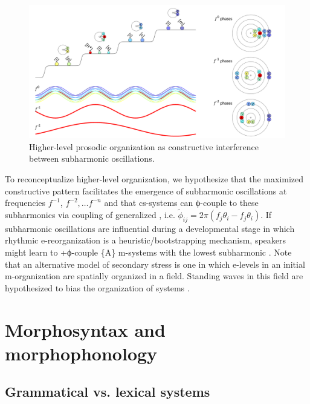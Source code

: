   
\begin{figure}
\includegraphics[width=\textwidth]{figures/Tilsen-img64.png}
\caption{Higher-level prosodic organization as constructive interference between subharmonic oscillations.}
\label{fig:4:14}
\end{figure}
 

  To reconceptualize higher-level  organization, we hypothesize that the maximized constructive  pattern facilitates the emergence of subharmonic oscillations at frequencies $f^{-1}$, $f^{-2}, \ldots f^{-n}$ and that cs-systems can ϕ-couple to these subharmonics via coupling of generalized , i.e. $\tilde{\phi}_{ij} = 2π(f_{j} θ_{i} - f_{j} θ_{i})$. If subharmonic oscillations are influential during a developmental stage in which rhythmic e-reorganization is a heuristic/bootstrapping mechanism, speakers might learn to +ϕ-couple \{A\} m-sys\-tems with the lowest subharmonic . Note that an alternative model of secondary stress is one in which e-levels in an initial m-organization are spatially organized in a field. Standing waves in this field are hypothesized to bias the organization of  systems \citep{Tilsen2018b}.

\section{Morphosyntax and morphophonology}
\rohead{\headmark}
\subsection{Grammatical vs. lexical systems}

